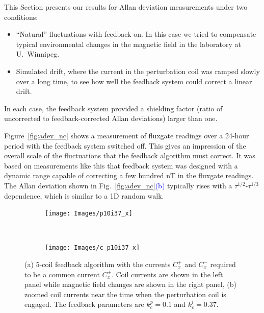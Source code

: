 
This Section presents our results for Allan deviation measurements
under two conditions:
\begin{itemize}
\item ``Natural'' fluctuations with feedback on.  In this case we tried to compensate typical environmental changes in the magnetic field in the laboratory at U.~Winnipeg.
\item Simulated drift, where the current in the perturbation coil was ramped slowly over a long time, to see how well the feedback system could correct a linear drift.
\end{itemize}

In each case, the feedback system provided a shielding factor (ratio of uncorrected to feedback-corrected Allan deviations) larger than one.



Figure~\ref{fig:adev_nc} shows a measurement of fluxgate readings over
a 24-hour period with the feedback system switched off.  This gives an
impression of the overall scale of the fluctuations that the feedback
algorithm must correct.  It was based on measurements like this that
feedback system was designed with a dynamic range capable of
correcting a few hundred nT in the fluxgate readings.  The Allan
deviation shown in Fig.~\ref{fig:adev_nc}\textcolor{blue}{(b)} typically rises with a
$\tau^{1/2}$-$\tau^{1/3}$ dependence, which is similar to a 1D random
walk.


\begin{figure}
     \begin{subfigure}{\textwidth} \centering \texttt{[image: Images/p10i37\_x]} \caption{}  \label{fig:1} \end{subfigure}\\[1ex] \begin{subfigure}{\textwidth} \centering \texttt{[image: Images/c\_p10i37\_x]} \caption{} \label{fig:2} \end{subfigure}
\caption[5-coil feedback algorithm with zoomed coil currents]{(a) 5-coil feedback algorithm with the currents $C_x^+$ and $C_x^-$ required to be a common current $C_x^\pm$. Coil currents are shown in the left panel while magnetic field changes are shown  in the right panel, (b) zoomed coil currents near the time when the perturbation coil is engaged. The feedback parameters are $k_c^p=0.1$ and $k_c^i=0.37$.}
    \label{fig:p10_i37_x}
\end{figure}


